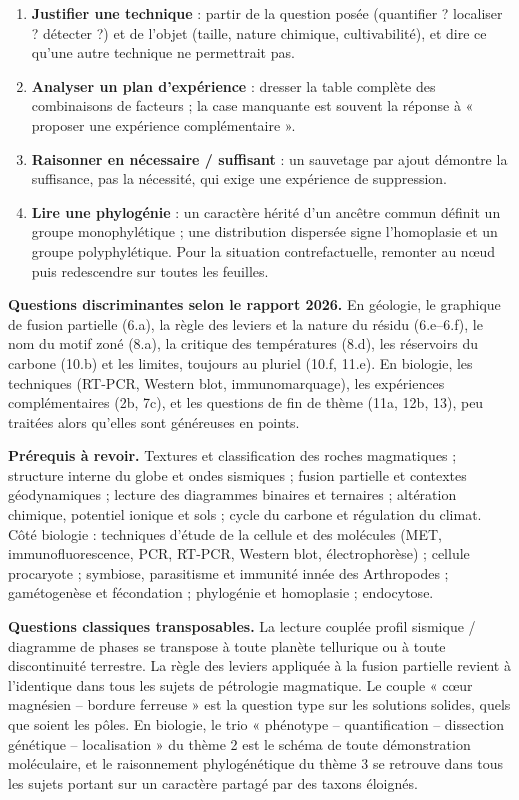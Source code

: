 \documentclass[11pt,a4paper]{article}
\begin{document}
\begin{enumerate}
\item
  \textbf{Justifier une technique} : partir de la question posée (quantifier ? localiser ? détecter ?) et de l'objet (taille, nature chimique, cultivabilité), et dire ce qu'une autre technique ne permettrait pas.
\item
  \textbf{Analyser un plan d'expérience} : dresser la table complète des combinaisons de facteurs ; la case manquante est souvent la réponse à « proposer une expérience complémentaire ».
\item
  \textbf{Raisonner en nécessaire / suffisant} : un sauvetage par ajout démontre la suffisance, pas la nécessité, qui exige une expérience de suppression.
\item
  \textbf{Lire une phylogénie} : un caractère hérité d'un ancêtre commun définit un groupe monophylétique ; une distribution dispersée signe l'homoplasie et un groupe polyphylétique. Pour la situation contrefactuelle, remonter au nœud puis redescendre sur toutes les feuilles.
\end{enumerate}

\textbf{Questions discriminantes selon le rapport 2026.} En géologie, le graphique de fusion partielle (6.a), la règle des leviers et la nature du résidu (6.e--6.f), le nom du motif zoné (8.a), la critique des températures (8.d), les réservoirs du carbone (10.b) et les limites, toujours au pluriel (10.f, 11.e). En biologie, les techniques (RT-PCR, Western blot, immunomarquage), les expériences complémentaires (2b, 7c), et les questions de fin de thème (11a, 12b, 13), peu traitées alors qu'elles sont généreuses en points.

\textbf{Prérequis à revoir.} Textures et classification des roches magmatiques ; structure interne du globe et ondes sismiques ; fusion partielle et contextes géodynamiques ; lecture des diagrammes binaires et ternaires ; altération chimique, potentiel ionique et sols ; cycle du carbone et régulation du climat. Côté biologie : techniques d'étude de la cellule et des molécules (MET, immunofluorescence, PCR, RT-PCR, Western blot, électrophorèse) ; cellule procaryote ; symbiose, parasitisme et immunité innée des Arthropodes ; gamétogenèse et fécondation ; phylogénie et homoplasie ; endocytose.

\textbf{Questions classiques transposables.} La lecture couplée profil sismique / diagramme de phases se transpose à toute planète tellurique ou à toute discontinuité terrestre. La règle des leviers appliquée à la fusion partielle revient à l'identique dans tous les sujets de pétrologie magmatique. Le couple « cœur magnésien -- bordure ferreuse » est la question type sur les solutions solides, quels que soient les pôles. En biologie, le trio « phénotype -- quantification -- dissection génétique -- localisation » du thème 2 est le schéma de toute démonstration moléculaire, et le raisonnement phylogénétique du thème 3 se retrouve dans tous les sujets portant sur un caractère partagé par des taxons éloignés.
\end{document}
